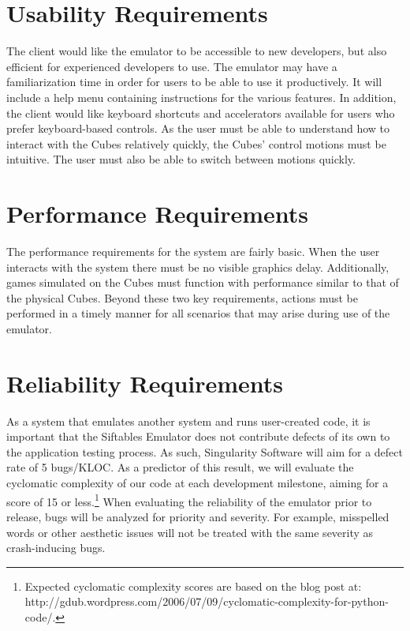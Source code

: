 \documentclass[12pt]{article}
\begin{document}


\section{Usability Requirements}
The client would like the emulator to be accessible to new developers, but also efficient for experienced developers to use. The emulator may have a familiarization time in order for users to be able to use it productively. It will include a help menu containing instructions for the various features. In addition, the client would like keyboard shortcuts and accelerators available for users who prefer keyboard-based controls. As the user must be able to understand how to interact with the Cubes relatively quickly, the Cubes' control motions must be intuitive. The user must also be able to switch between motions quickly.

\section{Performance Requirements}
The performance requirements for the system are fairly basic. When the user interacts with the system there must be no visible graphics delay. Additionally, games simulated on the Cubes must function with performance similar to that of the physical Cubes. Beyond these two key requirements, actions must be performed in a timely manner for all scenarios that may arise during use of the emulator.

\section{Reliability Requirements}
As a system that emulates another system and runs user-created code, it is important that the Siftables Emulator does not contribute defects of its own to the application testing process. As such, Singularity Software will aim for a defect rate of 5 bugs/KLOC. As a predictor of this result, we will evaluate the cyclomatic complexity of our code at each development milestone, aiming for a score of 15 or less.\footnote{Expected cyclomatic complexity scores are based on the blog post at: http://gdub.wordpress.com/2006/07/09/cyclomatic-complexity-for-python-code/.} When evaluating the reliability of the emulator prior to release, bugs will be analyzed for priority and severity. For example, misspelled words or other aesthetic issues will not be treated with the same severity as crash-inducing bugs.
\end{document}
